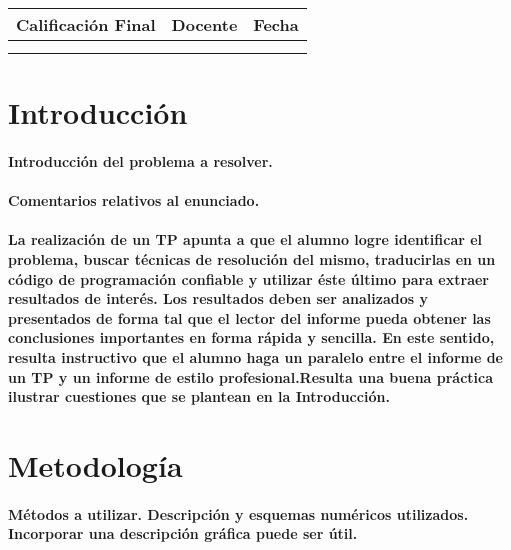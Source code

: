 \documentclass[a4paper,12pt]{article}
\begin{document}
\begin{center}
\begin{tabular}{ |c|c|c| } 
	\hline
	\textbf{Calificación Final} & \textbf{Docente} & \textbf{Fecha} \\ 
	\hline
	
	& &  \\
	
	& &  \\
	
	\hline
\end{tabular}
\end{center}


\newpage
\tableofcontents

\newpage
\section{Introducción}
\paragraph{\normalfont Introducción del problema a resolver.}
\paragraph{\normalfont Comentarios relativos al enunciado.}
\paragraph{\normalfont La realización de un TP apunta a que el alumno logre 
identificar el problema, buscar técnicas de resolución del mismo, 
traducirlas en un código de programación confiable y utilizar éste último 
para extraer resultados de interés. Los resultados deben ser analizados 
y presentados de forma tal que el lector del informe pueda obtener las 
conclusiones importantes en forma rápida y sencilla. En este sentido, 
resulta instructivo que  el alumno haga un paralelo entre el informe de 
un TP y un informe de estilo profesional.Resulta una buena práctica 
ilustrar cuestiones que se plantean en la Introducción.}

\section{Metodología}

\paragraph{\normalfont Métodos a utilizar. Descripción y esquemas numéricos utilizados. Incorporar una descripción gráfica puede ser útil.}
\end{document}
